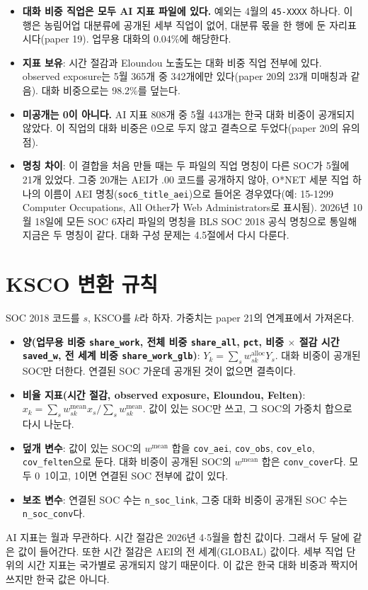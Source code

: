 \documentclass[11pt]{article}
\begin{document}
\begin{itemize}[leftmargin=*]
  \item \textbf{대화 비중 직업은 모두 AI 지표 파일에 있다.} 예외는 4월의 \texttt{45-XXXX} 하나다. 이 행은 농림어업 대분류에 공개된 세부 직업이 없어, 대분류 몫을 한 행에 둔 자리표시다(paper 19). 업무용 대화의 0.04\%에 해당한다.
  \item \textbf{지표 보유}: 시간 절감과 Eloundou 노출도는 대화 비중 직업 전부에 있다. observed exposure는 5월 365개 중 342개에만 있다(paper 20의 23개 미매칭과 같음). 대화 비중으로는 98.2\%를 덮는다.
  \item \textbf{미공개는 0이 아니다.} AI 지표 808개 중 5월 443개는 한국 대화 비중이 공개되지 않았다. 이 직업의 대화 비중은 0으로 두지 않고 결측으로 두었다(paper 20의 유의점).
  \item \textbf{명칭 차이}: 이 결합을 처음 만들 때는 두 파일의 직업 명칭이 다른 SOC가 5월에 21개 있었다. 그중 20개는 AEI가 .00 코드를 공개하지 않아, O*NET 세분 직업 하나의 이름이 AEI 명칭(\texttt{soc6\_title\_aei})으로 들어온 경우였다(예: 15-1299 Computer Occupations, All Other가 Web Administrators로 표시됨). 2026년 10월 18일에 모든 SOC 6자리 파일의 명칭을 BLS SOC 2018 공식 명칭으로 통일해 지금은 두 명칭이 같다. 대화 구성 문제는 4.5절에서 다시 다룬다.
\end{itemize}

\section{KSCO 변환 규칙}

SOC 2018 코드를 $s$, KSCO를 $k$라 하자. 가중치는 paper 21의 연계표에서 가져온다.
\begin{itemize}[leftmargin=*]
  \item \textbf{양(업무용 비중 \texttt{share\_work}, 전체 비중 \texttt{share\_all}, \texttt{pct}, 비중 $\times$ 절감 시간 \texttt{saved\_w}, 전 세계 비중 \texttt{share\_work\_glb})}: $Y_k = \sum_s w^{\text{alloc}}_{sk} Y_s$. 대화 비중이 공개된 SOC만 더한다. 연결된 SOC 가운데 공개된 것이 없으면 결측이다.
  \item \textbf{비율 지표(시간 절감, observed exposure, Eloundou, Felten)}: $x_k = \sum_s w^{\text{mean}}_{sk} x_s / \sum_s w^{\text{mean}}_{sk}$. 값이 있는 SOC만 쓰고, 그 SOC의 가중치 합으로 다시 나눈다.
  \item \textbf{덮개 변수}: 값이 있는 SOC의 $w^{\text{mean}}$ 합을 \texttt{cov\_aei}, \texttt{cov\_obs}, \texttt{cov\_elo}, \texttt{cov\_felten}으로 둔다. 대화 비중이 공개된 SOC의 $w^{\text{mean}}$ 합은 \texttt{conv\_cover}다. 모두 0~1이고, 1이면 연결된 SOC 전부에 값이 있다.
  \item \textbf{보조 변수}: 연결된 SOC 수는 \texttt{n\_soc\_link}, 그중 대화 비중이 공개된 SOC 수는 \texttt{n\_soc\_conv}다.
\end{itemize}
AI 지표는 월과 무관하다. 시간 절감은 2026년 4$\cdot$5월을 합친 값이다. 그래서 두 달에 같은 값이 들어간다. 또한 시간 절감은 AEI의 전 세계(GLOBAL) 값이다. 세부 직업 단위의 시간 지표는 국가별로 공개되지 않기 때문이다. 이 값은 한국 대화 비중과 짝지어 쓰지만 한국 값은 아니다.
\end{document}
